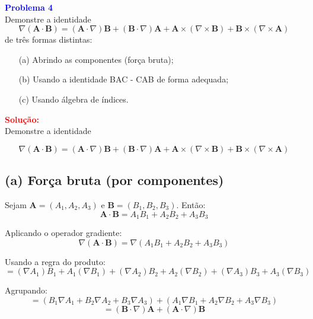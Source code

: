 \documentclass[a4paper,12pt]{article}
\begin{document}
\begin{flushleft}
\textbf{\textcolor{blue}{\Large Problema 4}}\\
Demonstre a identidade
\begin{equation}
\nabla (\mathbf{A} \cdot \mathbf{B}) = (\mathbf{A} \cdot \nabla) \mathbf{B} + (\mathbf{B} \cdot \nabla) \mathbf{A} + \mathbf{A} \times (\nabla \times \mathbf{B}) + \mathbf{B} \times (\nabla \times \mathbf{A})
\end{equation}
de três formas distintas:
\begin{itemize}
    \item[(a)] Abrindo as componentes (força bruta);
    \item[(b)] Usando a identidade BAC - CAB de forma adequada;
    \item[(c)] Usando álgebra de índices.
\end{itemize}

\textcolor{red}{\textbf{Solução:}}\\
Demonstre a identidade

\begin{equation}
\nabla (\mathbf{A} \cdot \mathbf{B}) = (\mathbf{A} \cdot \nabla) \mathbf{B} + (\mathbf{B} \cdot \nabla) \mathbf{A} + \mathbf{A} \times (\nabla \times \mathbf{B}) + \mathbf{B} \times (\nabla \times \mathbf{A})
\end{equation}

\subsection*{(a) Força bruta (por componentes)}

Sejam \( \mathbf{A} = (A_1, A_2, A_3) \) e \( \mathbf{B} = (B_1, B_2, B_3) \). Então:
\begin{equation}
\mathbf{A} \cdot \mathbf{B} = A_1 B_1 + A_2 B_2 + A_3 B_3
\end{equation}

Aplicando o operador gradiente:
\begin{equation}
\nabla (\mathbf{A} \cdot \mathbf{B}) = \nabla (A_1 B_1 + A_2 B_2 + A_3 B_3)
\end{equation}

Usando a regra do produto:
\begin{equation}
= (\nabla A_1) B_1 + A_1 (\nabla B_1) + (\nabla A_2) B_2 + A_2 (\nabla B_2) + (\nabla A_3) B_3 + A_3 (\nabla B_3)
\end{equation}

Agrupando:
\begin{equation}
= (B_1 \nabla A_1 + B_2 \nabla A_2 + B_3 \nabla A_3) + (A_1 \nabla B_1 + A_2 \nabla B_2 + A_3 \nabla B_3)
\end{equation}
\begin{equation}
= (\mathbf{B} \cdot \nabla) \mathbf{A} + (\mathbf{A} \cdot \nabla) \mathbf{B}
\end{equation}


\end{flushleft}
\end{document}
